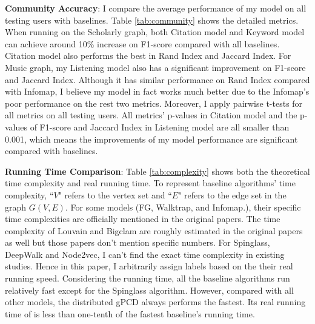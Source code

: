 \textbf{Community Accuracy}: I compare the average performance of my model on all testing users with baselines. Table \ref{tab:community} shows the detailed metrics. When running on the Scholarly graph, both Citation model and Keyword model can achieve around 10\% increase on F1-score compared with all baselines. Citation model also performs the best in Rand Index and Jaccard Index. For Music graph, my Listening model also has a significant improvement on F1-score and Jaccard Index. Although it has similar performance on Rand Index compared with Infomap, I believe my model in fact works much better due to the Infomap's poor performance on the rest two metrics. Moreover, I apply pairwise t-tests for all metrics on all testing users. All metrics' p-values in Citation model and the p-values of F1-score and Jaccard Index in Listening model are all smaller than 0.001, which means the improvements of my model performance are significant compared with baselines.


\textbf{Running Time Comparison}: Table \ref{tab:complexity} shows both the theoretical time complexity and real running time. To represent baseline algorithms' time complexity, ``$V$" refers to the vertex set and ``$E$" refers to the edge set in the graph $G(V,E)$. For some models (FG, Walktrap, and Infomap.), their specific time complexities are officially mentioned in the original papers. The time complexity of Louvain and Bigclam are roughly estimated in the original papers as well but those papers don't mention specific numbers. For Spinglass, DeepWalk and Node2vec, I can't find the exact time complexity in existing studies. Hence in this paper, I arbitrarily assign labels based on the their real running speed. Considering the running time, all the baseline algorithms run relatively fast except for the Spinglass algorithm. However, compared with all other models, the distributed gPCD always performs the fastest. Its real running time of is less than one-tenth of the fastest baseline's running time. 

